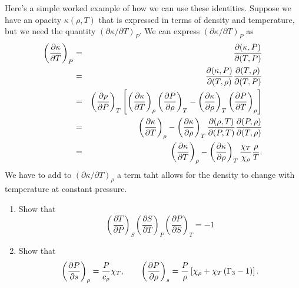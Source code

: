 Here's a simple worked example of how we can use these identities.  Suppose we have an opacity $\kappa(\rho,T)$ that is expressed in terms of density and temperature, but we need the quantity $(\partial \kappa/\partial T)_{P}$. We can express $(\partial\kappa/\partial T)_{P}$ as
\begin{eqnarray}
\left(\frac{\partial \kappa}{\partial T}\right)_{P} &=& \frac{\partial(\kappa,P)}{\partial(T,P)}\nonumber\\
 &=& \frac{\partial(\kappa,P)}{\partial(T,\rho)}\frac{\partial(T,\rho)}{\partial(T,P)}\nonumber\\
 &=& \left(\frac{\partial \rho}{\partial P}\right)_{T}\left[\left(\frac{\partial \kappa}{\partial T}\right)_{\rho}\left(\frac{\partial P}{\partial \rho}\right)_{T}-\left(\frac{\partial \kappa}{\partial \rho}\right)_{T}\left(\frac{\partial P}{\partial T}\right)_{\rho}\right]
 \nonumber\\
 &=& \left(\frac{\partial \kappa}{\partial T}\right)_{\rho} - \left(\frac{\partial \kappa}{\partial \rho}\right)_{T}\frac{\partial(\rho,T)}{\partial(P,T)}\frac{\partial(P,\rho)}{\partial(T,\rho)}\nonumber\\
 &=& \left(\frac{\partial \kappa}{\partial T}\right)_{\rho} - \left(\frac{\partial \kappa}{\partial \rho}\right)_{T} \frac{\chi_{T}}{\chi_{\rho}}\frac{\rho}{T}.
\end{eqnarray}
We have to add to $(\partial \kappa/\partial T)_{\rho}$ a term taht allows for the density to change with temperature at constant pressure.

\begin{exercisebox}
\begin{enumerate}
\item Show that 
\[
 	\left(\frac{\partial T}{\partial P}\right)_{S} 
 	\left(\frac{\partial S}{\partial T}\right)_{P} 
 	\left(\frac{\partial P}{\partial S}\right)_{T} = -1
\]

\item \label{ex.gamma-trans} Show that
\[ 
\left(\frac{\partial P}{\partial s}\right)_{\rho} = \frac{P}{c_{\rho}}\chi_{T},\qquad \left(\frac{\partial P}{\partial \rho}\right)_{s} = \frac{P}{\rho}\left[\chi_{\rho} + \chi_{T}\left(\Gamma_{3}-1\right)\right].
\]
\end{enumerate}
\end{exercisebox}
